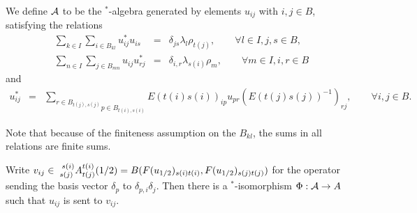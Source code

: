 \begin{Def} We define $\DA$ to be the $^*$-algebra generated by elements $u_{ij}$ with $i,j\in B$, satisfying the relations \begin{eqnarray*} \sum_{k\in I}\sum_{i\in B_{kl}} u_{ij}^*u_{is} &=& \delta_{js} \lambda_{l}\rho_{t(j)},\qquad \forall l\in I,j,s\in B, \\ \sum_{n\in I}\sum_{j\in B_{mn}} u_{ij}u_{rj}^* &=& \delta_{i,r}\lambda_{s(i)}\rho_m,\qquad\forall m\in I,i,r\in B\end{eqnarray*} and \begin{eqnarray*} u_{ij}^* &=& \underset{p\in B_{t(i),s(i)}}{\underset{r\in B_{t(j),s(j)}}{\sum}} E(t(i)s(i))_{ip}u_{pr}(E(t(j)s(j))^{-1})_{rj},\qquad \forall i,j\in B.\end{eqnarray*}
\end{Def}

Note that because of the finiteness assumption on the $B_{kl}$, the sums in all relations are finite sums.

\begin{Prop} Write $v_{ij}\in \Gr{A}{s(i)}{t(i)}{s(j)}{t(j)}(1/2) = B(F(u_{1/2})_{s(i)t(i)},F(u_{1/2})_{s(j)t(j)})$ for the operator sending the basis vector $\delta_{p}$ to $\delta_{p,i} \delta_j$. Then there is a $^*$-isomorphism $\Phi:\DA\rightarrow A$ such that $u_{ij}$ is sent to $v_{ij}$.
\end{Prop}


